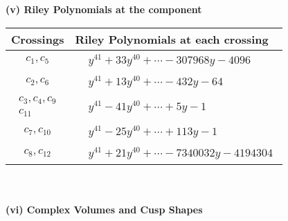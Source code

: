 \documentclass[1p]{elsarticle_modified}
\theoremstyle{definition}
\begin{document}
\newpage\renewcommand{\arraystretch}{1}
\flushleft \textbf{(v) Riley Polynomials at the component}\newline \\
\begin{tabular}{m{50pt}|m{274pt}}
Crossings & \hspace{64pt}Riley Polynomials at each crossing \\
\hline $$\begin{aligned}c_{1},c_{5}\end{aligned}$$&$\begin{aligned}
&y^{41}+33 y^{40}+\cdots-307968 y-4096
\end{aligned}$\\
\hline $$\begin{aligned}c_{2},c_{6}\end{aligned}$$&$\begin{aligned}
&y^{41}+13 y^{40}+\cdots-432 y-64
\end{aligned}$\\
\hline $$\begin{aligned}c_{3},c_{4},c_{9}\\c_{11}\end{aligned}$$&$\begin{aligned}
&y^{41}-41 y^{40}+\cdots+5 y-1
\end{aligned}$\\
\hline $$\begin{aligned}c_{7},c_{10}\end{aligned}$$&$\begin{aligned}
&y^{41}-25 y^{40}+\cdots+113 y-1
\end{aligned}$\\
\hline $$\begin{aligned}c_{8},c_{12}\end{aligned}$$&$\begin{aligned}
&y^{41}+21 y^{40}+\cdots-7340032 y-4194304
\end{aligned}$\\
\hline
\end{tabular}\\~\\
\newpage\flushleft \textbf{(vi) Complex Volumes and Cusp Shapes}
\end{document}
